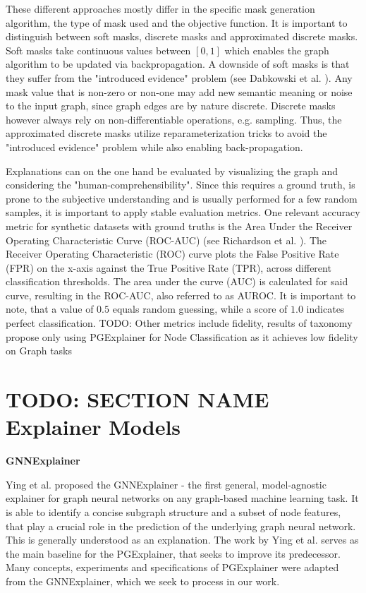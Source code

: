 These different approaches mostly differ in the specific mask generation algorithm, the type of mask used and the objective function. It is important to distinguish between soft masks, discrete masks and approximated discrete masks. Soft masks take continuous values between $[0,1]$ which enables the graph algorithm to be updated via backpropagation. A downside of soft masks is that they suffer from the "introduced evidence" problem (see Dabkowski et al. \cite{dabkowski2017real}). Any mask value that is non-zero or non-one may add new semantic meaning or noise to the input graph, since graph edges are by nature discrete. Discrete masks however always rely on non-differentiable operations, e.g. sampling. Thus, the approximated discrete masks utilize reparameterization tricks to avoid the "introduced evidence" problem while also enabling back-propagation. %

Explanations can on the one hand be evaluated by visualizing the graph and considering the "human-comprehensibility". Since this requires a ground truth, is prone to the subjective understanding and is usually performed for a few random samples, it is important to apply stable evaluation metrics. One relevant accuracy metric for synthetic datasets with ground truths is the Area Under the Receiver Operating Characteristic Curve (ROC-AUC) (see Richardson et al. \cite{RICHARDSON2024100994}). The Receiver Operating Characteristic (ROC) curve plots the False Positive Rate (FPR) on the x-axis against the True Positive Rate (TPR), across different classification thresholds. The area under the curve (AUC) is calculated for said curve, resulting in the ROC-AUC, also referred to as AUROC. It is important to note, that a value of $0.5$ equals random guessing, while a score of $1.0$ indicates perfect classification. TODO: Other metrics include fidelity, results of taxonomy propose only using PGExplainer for Node Classification as it achieves low fidelity on Graph tasks


\section{TODO: SECTION NAME Explainer Models}
\label{sec:Explainer_Models}

\textbf{GNNExplainer} \par
Ying et al. proposed the GNNExplainer \cite{ying2019gnnexplainer} - the first general, model-agnostic explainer for graph neural networks on any graph-based machine learning task. It is able to identify a concise subgraph structure and a subset of node features, that play a crucial role in the prediction of the underlying graph neural network. This is generally understood as an explanation. The work by Ying et al. serves as the main baseline for the PGExplainer, that seeks to improve its predecessor. Many concepts, experiments and specifications of PGExplainer were adapted from the GNNExplainer, which we seek to process in our work. \bigskip

